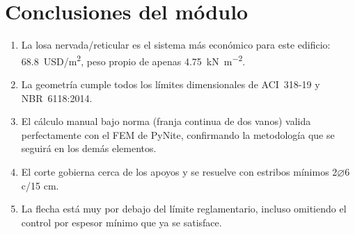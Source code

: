 \section{Conclusiones del módulo}
\label{sec:conclusiones}

\begin{enumerate}
  \item La losa nervada/reticular es el sistema más económico para este
        edificio: \SI{68,8}{USD/m^2}, peso propio de apenas
        \SI{4,75}{\kilo\newton\per\square\meter}.
  \item La geometría cumple todos los límites dimensionales de
        ACI~318-19 y NBR~6118:2014.
  \item El cálculo manual bajo norma (franja continua de dos vanos)
        valida perfectamente con el FEM de PyNite, confirmando la
        metodología que se seguirá en los demás elementos.
  \item El corte gobierna cerca de los apoyos y se resuelve con estribos
        mínimos 2$\varnothing$6 c/15 cm.
  \item La flecha está muy por debajo del límite reglamentario, incluso
        omitiendo el control por espesor mínimo que ya se satisface.
\end{enumerate}